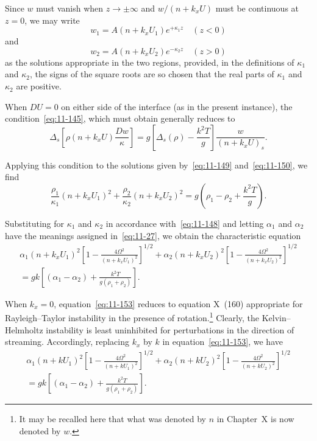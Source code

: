 Since $w$ must vanish when $z \to \pm\infty$ and $w/(n+k_x U)$ must be continuous at $z = 0$, we may write
\begin{equation}
\label{eq:11-149}
w_1 = A(n+k_x U_1)e^{+\kappa_1 z} \quad (z < 0)
\end{equation}
and
\begin{equation}
\label{eq:11-150}
w_2 = A(n+k_x U_2)e^{-\kappa_2 z} \quad (z > 0)
\end{equation}
as the solutions appropriate in the two regions, provided, in the definitions of $\kappa_1$ and $\kappa_2$, the signs of the square roots are so chosen that the real parts of $\kappa_1$ and $\kappa_2$ are positive.

When $DU = 0$ on either side of the interface (as in the present instance), the condition~\eqref{eq:11-145}, which must obtain generally reduces to
\begin{equation}
\label{eq:11-151}
\Delta_s\!\left[\rho(n+k_x U)\frac{Dw}{\kappa}\right] = g\!\left[\Delta_s(\rho)-\frac{k^2T}{g}\right]\!\frac{w}{(n+k_x U)_s}.
\end{equation}

Applying this condition to the solutions given by~\eqref{eq:11-149} and~\eqref{eq:11-150}, we find
\begin{equation}
\label{eq:11-152}
\frac{\rho_1}{\kappa_1}(n+k_x U_1)^2+\frac{\rho_2}{\kappa_2}(n+k_x U_2)^2 = g\!\left(\rho_1-\rho_2+\frac{k^2T}{g}\right)\!.
\end{equation}

Substituting for $\kappa_1$ and $\kappa_2$ in accordance with~\eqref{eq:11-148} and letting $\alpha_1$ and $\alpha_2$ have the meanings assigned in~\eqref{eq:11-27}, we obtain the characteristic equation
\begin{multline}
\label{eq:11-153}
\alpha_1(n+k_x U_1)^2\!\left[1-\frac{4\Omega^2}{(n+k_x U_1)^2}\right]^{1/2}+\alpha_2(n+k_x U_2)^2\!\left[1-\frac{4\Omega^2}{(n+k_x U_2)^2}\right]^{1/2} \\
= gk\!\left[(\alpha_1-\alpha_2)+\frac{k^2T}{g(\rho_1+\rho_2)}\right]\!.
\end{multline}

When $k_x = 0$, equation~\eqref{eq:11-153} reduces to equation X~(160) appropriate for Rayleigh--Taylor instability in the presence of rotation.\footnote{It may be recalled here that what was denoted by $n$ in Chapter~X is now denoted by $w$.} Clearly, the Kelvin--Helmholtz instability is least uninhibited for perturbations in the direction of streaming. Accordingly, replacing $k_x$ by $k$ in equation~\eqref{eq:11-153}, we have
\begin{multline}
\label{eq:11-154}
\alpha_1(n+k U_1)^2\!\left[1-\frac{4\Omega^2}{(n+k U_1)^2}\right]^{1/2}+\alpha_2(n+k U_2)^2\!\left[1-\frac{4\Omega^2}{(n+k U_2)^2}\right]^{1/2} \\
= gk\!\left[(\alpha_1-\alpha_2)+\frac{k^2T}{g(\rho_1+\rho_2)}\right]\!.
\end{multline}

